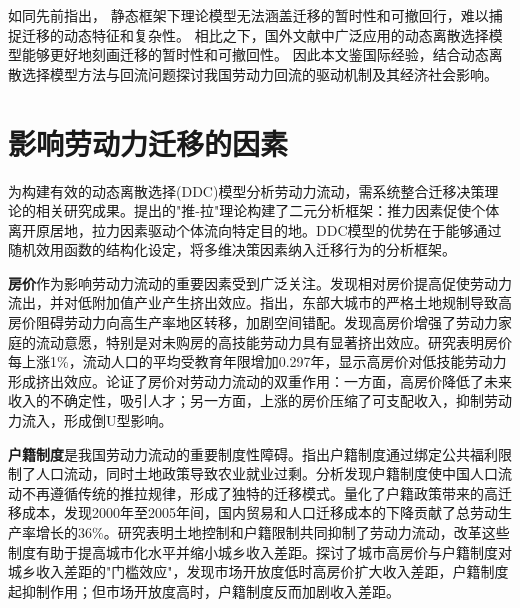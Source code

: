\documentclass[a4paper, zihao=-4, fontset = mac, oneside]{ctexbook} %
\begin{document}
如同先前指出，
静态框架下理论模型无法涵盖迁移的暂时性和可撤回行，难以捕捉迁移的动态特征和复杂性。
相比之下，国外文献中广泛应用的动态离散选择模型能够更好地刻画迁移的暂时性和可撤回性。
因此本文鉴国际经验，结合动态离散选择模型方法与回流问题探讨我国劳动力回流的驱动机制及其经济社会影响。


\section{影响劳动力迁移的因素}
\label{sec:_影响劳动力迁移的因素}

为构建有效的动态离散选择(DDC)模型分析劳动力流动，需系统整合迁移决策理论的相关研究成果。\textcite{leeTheoryMigration1966}提出的"推-拉"理论构建了二元分析框架：推力因素促使个体离开原居地，拉力因素驱动个体流向特定目的地。DDC模型的优势在于能够通过随机效用函数的结构化设定，将多维决策因素纳入迁移行为的分析框架。

\textbf{房价}作为影响劳动力流动的重要因素受到广泛关注。\textcite{GaoBoQuYuFangJieChaiYiLaoDongLiLiuDongYuChanYeShengJi2012}发现相对房价提高促使劳动力流出，并对低附加值产业产生挤出效应。\textcite{WangLiLiTuDiGongGeiFangJieYuLaoDongLiKongJianPeiZhiXiaoLu2023}指出，东部大城市的严格土地规制导致高房价阻碍劳动力向高生产率地区转移，加剧空间错配。\textcite{ZhouYingGangGaoFangJieJiChuLiaoShuiJiYuZhongGuoLiuDongRenKouDeWeiGuanShiJiao2019}发现高房价增强了劳动力家庭的流动意愿，特别是对未购房的高技能劳动力具有显著挤出效应。\textcite{zhouHousingPricesMigration2022}研究表明房价每上涨1\%，流动人口的平均受教育年限增加0.297年，显示高房价对低技能劳动力形成挤出效应。\textcite{ZhangLiFangJieRuHeYingXiangLaoDongLiLiuDong2017}论证了房价对劳动力流动的双重作用：一方面，高房价降低了未来收入的不确定性，吸引人才；另一方面，上涨的房价压缩了可支配收入，抑制劳动力流入，形成倒U型影响。

\textbf{户籍制度}是我国劳动力流动的重要制度性障碍。\textcite{ngaiChinasMobilityBarriers2019}指出户籍制度通过绑定公共福利限制了人口流动，同时土地政策导致农业就业过剩。\textcite{LiQiangYingXiangZhongGuoChengXiangLiuDongRenKouDeTuiLiYuLaLiYinSuFenXi2003}分析发现户籍制度使中国人口流动不再遵循传统的推拉规律，形成了独特的迁移模式。\textcite{tombeTradeMigrationProductivity2019}量化了户籍政策带来的高迁移成本，发现2000年至2005年间，国内贸易和人口迁移成本的下降贡献了总劳动生产率增长的36\%。\textcite{ZhouWenTuDiLiuZhuanHuJiZhiDuGaiGeYuZhongGuoChengShiHuaLiLunYuMoNi2017}研究表明土地控制和户籍限制共同抑制了劳动力流动，改革这些制度有助于提高城市化水平并缩小城乡收入差距。\textcite{AnHuSenChengShiGaoFangJieHeHuJiZhiDuCuJinHuoYiZhiChengXiangShouRuChaiJuKuoDaZhongGuoLaoDongLiLiuDongHeShouRuChaiJuKuoDaBeiLunDeYiGeJieShi2011}探讨了城市高房价与户籍制度对城乡收入差距的"门槛效应"，发现市场开放度低时高房价扩大收入差距，户籍制度起抑制作用；但市场开放度高时，户籍制度反而加剧收入差距。
\end{document}

